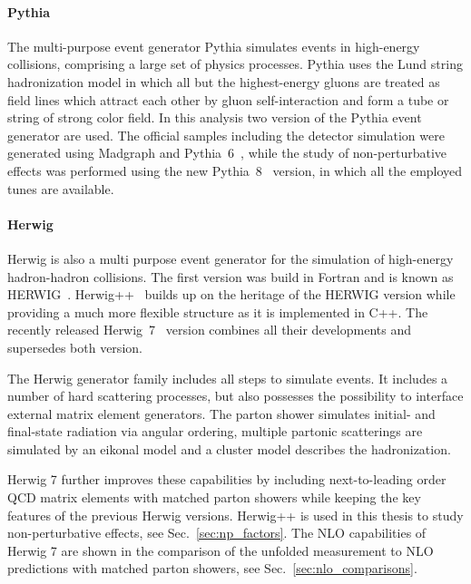 \paragraph{Pythia}

The multi-purpose event generator Pythia simulates events in high-energy
collisions, comprising a large set of physics processes. Pythia uses the Lund
string hadronization model in which all but the highest-energy gluons are
treated as field lines which attract each other by gluon self-interaction and
form a tube or string of strong color field. In this analysis two version of the
Pythia event generator are used. The official samples including the detector
simulation were generated using Madgraph and Pythia~6~\cite{Sjostrand:2006za},
while the study of non-perturbative effects was performed using the new
Pythia~8~\cite{Sjostrand:2007gs} version, in which all the employed tunes are
available. 

\paragraph{Herwig}

Herwig is also a multi purpose event generator for the simulation of high-energy
hadron-hadron collisions. The first version was build in Fortran and is known as
HERWIG~\cite{Corcella:2000bw}. Herwig++~\cite{Bahr:2008pv} builds up on the
heritage of the HERWIG version while providing a much more flexible structure as
it is implemented in C++. The recently released Herwig~7~\cite{Bellm:2015jjp}
version combines all their developments and supersedes both version. 

The Herwig generator family includes all steps to simulate events. It includes a
number of hard scattering processes, but also possesses the possibility to
interface external matrix element generators. The parton shower simulates
initial- and final-state radiation via angular ordering, multiple partonic
scatterings are simulated by an eikonal model and a cluster model describes the
hadronization. 

Herwig 7 further improves these capabilities by including next-to-leading order
QCD matrix elements with matched parton showers while keeping the key features
of the previous Herwig versions. Herwig++ is used in this thesis to study
non-perturbative effects, see Sec.~\ref{sec:np_factors}. The NLO capabilities of
Herwig 7 are shown in the comparison of the unfolded measurement to NLO
predictions with matched parton showers, see Sec.~\ref{sec:nlo_comparisons}.

